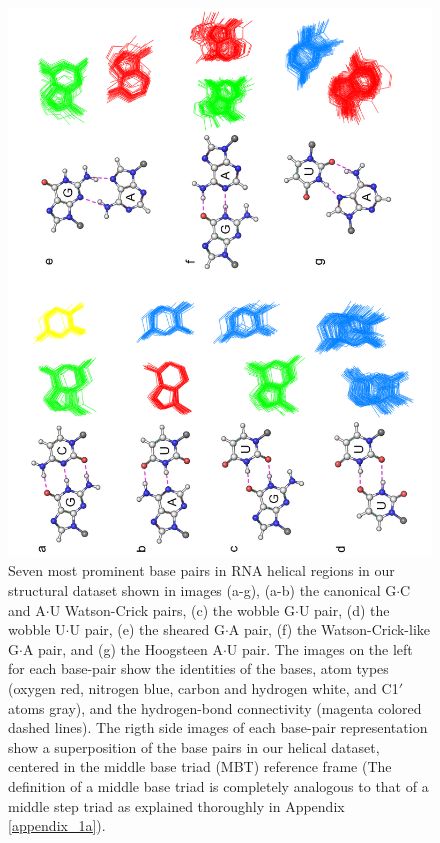 \begin{figure}[ht]
\centering
\includegraphics[angle=-90, scale=0.75]{Chapter3/sevenpairs.png}
\caption{Seven most prominent base pairs in RNA helical regions in our
  structural  dataset  shown  in  images (a-g),  (a-b)  the  canonical
  G$\cdot$C and A$\cdot$U Watson-Crick pairs, (c) the wobble G$\cdot$U
  pair, (d) the wobble U$\cdot$U pair, (e) the sheared G$\cdot$A pair,
  (f)  the Watson-Crick-like  G$\cdot$A  pair, and  (g) the  Hoogsteen
  A$\cdot$U pair.  The images on  the left for each base-pair show the
  identities  of the  bases, atom  types (oxygen  red,  nitrogen blue,
  carbon  and   hydrogen  white,  and  C1$'$  atoms   gray),  and  the
  hydrogen-bond  connectivity  (magenta  colored dashed  lines).   The
  rigth  side   images  of   each  base-pair  representation   show  a
  superposition of the base pairs  in our helical dataset, centered in
  the middle  base triad  (MBT) reference frame  (The definition  of a
  middle base triad  is completely analogous to that  of a middle step
  triad as explained thoroughly in Appendix \ref{appendix_1a}).}
\label{fig:pairs}
\end{figure}

